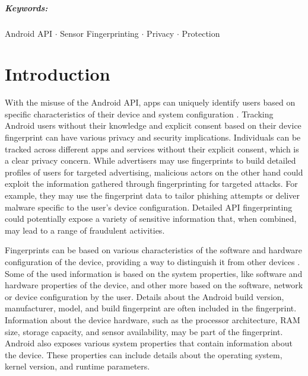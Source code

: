 \documentclass[11pt,
  oneside,openany,    %
]{scrreprt}
\begin{document}
\paragraph{Keywords:}
Android API $\cdot$
Sensor Fingerprinting $\cdot$
Privacy $\cdot$
Protection

\cleardoublepage

\chapter{Introduction}
\label{chap:introduction}

With the misuse of the Android API, apps can uniquely identify users based on specific characteristics of their device and system configuration \cite{10.1145/3407023.3407055}.
Tracking Android users without their knowledge and explicit consent based on their device fingerprint can have various privacy and security implications. 
Individuals can be tracked across different apps and services without their explicit consent, which is a clear privacy concern.
While advertisers may use fingerprints to build detailed profiles of users for targeted advertising, malicious actors on the other hand could exploit the information gathered through fingerprinting for targeted attacks. 
For example, they may use the fingerprint data to tailor phishing attempts or deliver malware specific to the user's device configuration.
Detailed API fingerprinting could potentially expose a variety of sensitive information that, when combined, may lead to a range of fraudulent activities.

Fingerprints can be based on various characteristics of the software and hardware configuration of the device, providing a way to distinguish it from other devices \cite{wu2016efficient, das2014poster, li2010source, amerini2017smartphone, das2016smartphone}.
Some of the used information is based on the system properties, like software and hardware properties of the device, and other more based on the software, network or device configuration by the user. 
Details about the Android build version, manufacturer, model, and build fingerprint are often included in the fingerprint. 
Information about the device hardware, such as the processor architecture, RAM size, storage capacity, and sensor availability, may be part of the fingerprint.
Android also exposes various system properties that contain information about the device. 
These properties can include details about the operating system, kernel version, and runtime parameters.
\end{document}
